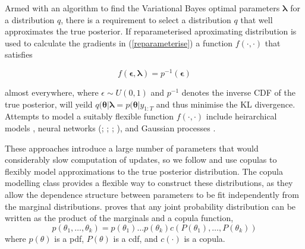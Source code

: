 \documentclass[12pt,a4paper]{article}%
\numberwithin{equation}{section}
\begin{document}
Armed with an algorithm to find the Variational Bayes optimal parameters $\boldsymbol{\lambda}$ for a distribution $q$, there is a requirement to select a distribution $q$ that well approximates the true posterior. If reparameterised aproximating distribution is used to calculate the gradients in (\ref{reparameterise}) a function $f(\cdot, \cdot)$ that satisfies 

\begin{equation}
\label{optimalf}
f(\boldsymbol{\epsilon}, \boldsymbol{\lambda}) = p^{-1}(\boldsymbol{\epsilon})
\end{equation}

almost everywhere, where $\epsilon \sim U(0, 1)$ and $p^{-1}$ denotes the inverse CDF of the true posterior, will yeild $q(\boldsymbol{\theta} | \boldsymbol{\lambda} = p(\boldsymbol{\theta} | y_{1:T}$ and thus minimise the KL divergence. Attempts to model a suitably flexible function $f(\cdot, \cdot)$ include heirarchical models \citep{Ranganath2016a}, neural networks (\citealp{Kingma2014}; \citealp{Rezende2014}; \citealp{Rezende2015}; \citealp{Kingma2016}), and Gaussian processes \citep{Tran2016}.

These approaches introduce a large number of parameters that would considerably slow computation of updates, so we follow \citet{Tran2015} and use copulas to flexibly model approximations to the true posterior distribution. The copula modelling class provides a flexible way to construct these distributions, as they allow the dependence structure between parameters to be fit independently from the marginal distributions. \citet{Sklar1959} proves that any joint probability distribution can be written as the product of the marginals and a copula function,
\begin{equation}
\label{vc1}
p(\theta_1, \dots, \theta_k) = p(\theta_1) \dots p(\theta_k) c(P(\theta_1), \dots, P(\theta_k))
\end{equation}
where $p(\theta)$ is a pdf, $P(\theta)$ is a cdf, and $c(\cdot)$ is a copula. 
\end{document}
